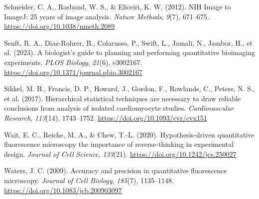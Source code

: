 \documentclass[
]{agujournal2019}
\newlength{\cslhangindent}
\newlength{\cslentryspacingunit} %
\newenvironment{CSLReferences}[2] %
 {%
  \setlength{\parindent}{0pt}
  \ifodd #1
  \let\oldpar\par
  \def\par{\hangindent=\cslhangindent\oldpar}
  \fi
  \setlength{\parskip}{#2\cslentryspacingunit}
 }%
 {}
\begin{document}
\begin{CSLReferences}{1}{0}
\leavevmode{}%
Schneider, C. A., Rasband, W. S., \& Eliceiri, K. W. (2012). NIH Image
to ImageJ: 25 years of image analysis. \emph{Nature Methods},
\emph{9}(7), 671--675. \url{https://doi.org/10.1038/nmeth.2089}

\leavevmode{}%
Senft, R. A., Diaz-Rohrer, B., Colarusso, P., Swift, L., Jamali, N.,
Jambor, H., et al. (2023). A biologist{'}s guide to planning and
performing quantitative bioimaging experiments. \emph{PLOS Biology},
\emph{21}(6), e3002167.
\url{https://doi.org/10.1371/journal.pbio.3002167}

\leavevmode{}%
Sikkel, M. B., Francis, D. P., Howard, J., Gordon, F., Rowlands, C.,
Peters, N. S., et al. (2017). Hierarchical statistical techniques are
necessary to draw reliable conclusions from analysis of isolated
cardiomyocyte studies. \emph{Cardiovascular Research}, \emph{113}(14),
1743--1752. \url{https://doi.org/10.1093/cvr/cvx151}

\leavevmode{}%
Wait, E. C., Reiche, M. A., \& Chew, T.-L. (2020). Hypothesis-driven
quantitative fluorescence microscopy {\textendash} the importance of
reverse-thinking in experimental design. \emph{Journal of Cell Science},
\emph{133}(21). \url{https://doi.org/10.1242/jcs.250027}

\leavevmode{}%
Waters, J. C. (2009). Accuracy and precision in quantitative
fluorescence microscopy. \emph{Journal of Cell Biology}, \emph{185}(7),
1135--1148. \url{https://doi.org/10.1083/jcb.200903097}

\end{CSLReferences}
\end{document}
